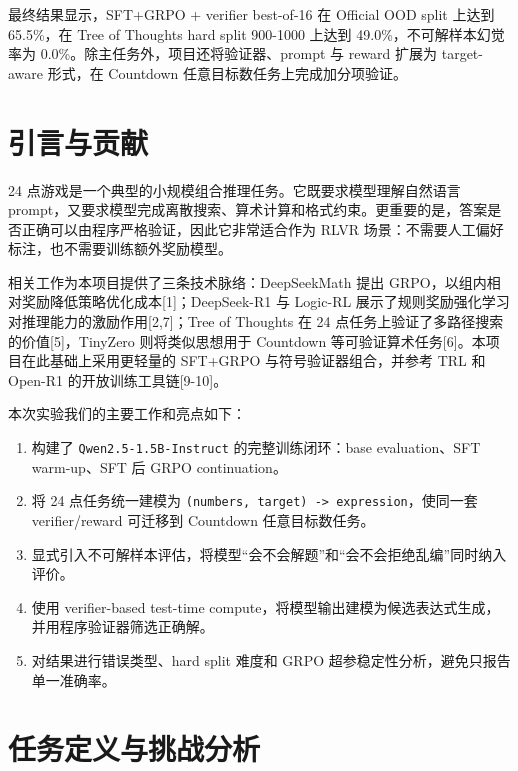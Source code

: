 \documentclass[UTF8,a4paper,12pt]{ctexart}
\providecommand{\tightlist}{\setlength{\itemsep}{0pt}\setlength{\parskip}{0pt}}
\begin{document}
最终结果显示，SFT+GRPO + verifier best-of-16 在 Official OOD split 上达到 65.5\%，在 Tree of Thoughts hard split 900-1000 上达到 49.0\%，不可解样本幻觉率为 0.0\%。除主任务外，项目还将验证器、prompt 与 reward 扩展为 target-aware 形式，在 Countdown 任意目标数任务上完成加分项验证。

\clearpage

\section{引言与贡献}\label{ux5f15ux8a00ux4e0eux8d21ux732e}

24 点游戏是一个典型的小规模组合推理任务。它既要求模型理解自然语言 prompt，又要求模型完成离散搜索、算术计算和格式约束。更重要的是，答案是否正确可以由程序严格验证，因此它非常适合作为 RLVR 场景：不需要人工偏好标注，也不需要训练额外奖励模型。

相关工作为本项目提供了三条技术脉络：DeepSeekMath 提出 GRPO，以组内相对奖励降低策略优化成本{[}1{]}；DeepSeek-R1 与 Logic-RL 展示了规则奖励强化学习对推理能力的激励作用{[}2,7{]}；Tree of Thoughts 在 24 点任务上验证了多路径搜索的价值{[}5{]}，TinyZero 则将类似思想用于 Countdown 等可验证算术任务{[}6{]}。本项目在此基础上采用更轻量的 SFT+GRPO 与符号验证器组合，并参考 TRL 和 Open-R1 的开放训练工具链{[}9-10{]}。

本次实验我们的主要工作和亮点如下：

\begin{enumerate}
\def\labelenumi{\arabic{enumi}.}
\tightlist
\item
  构建了 \texttt{Qwen2.5-1.5B-Instruct} 的完整训练闭环：base evaluation、SFT warm-up、SFT 后 GRPO continuation。
\item
  将 24 点任务统一建模为 \texttt{(numbers,\ target)\ -\textgreater{}\ expression}，使同一套 verifier/reward 可迁移到 Countdown 任意目标数任务。
\item
  显式引入不可解样本评估，将模型``会不会解题''和``会不会拒绝乱编''同时纳入评价。
\item
  使用 verifier-based test-time compute，将模型输出建模为候选表达式生成，并用程序验证器筛选正确解。
\item
  对结果进行错误类型、hard split 难度和 GRPO 超参稳定性分析，避免只报告单一准确率。
\end{enumerate}

\section{任务定义与挑战分析}\label{ux4efbux52a1ux5b9aux4e49ux4e0eux6311ux6218ux5206ux6790}
\end{document}
